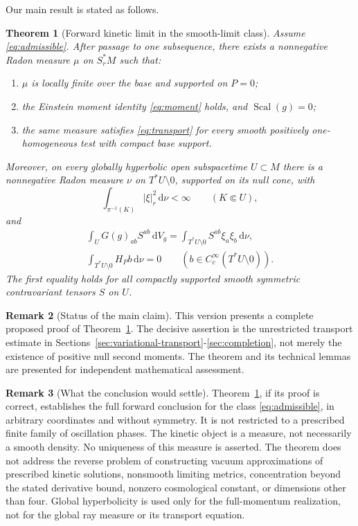 \documentclass[11pt,a4paper]{article}
\numberwithin{equation}{section}
\newcommand{\Scal}{\operatorname{Scal}}
\newcommand{\dd}{\mathrm d}
\newcommand{\dV}{\dd V_g}
\newtheorem{theorem}{Theorem}[section]
\theoremstyle{definition}
\newtheorem{remark}[theorem]{Remark}
\begin{document}
Our main result is stated as follows.

\begin{theorem}[Forward kinetic limit in the smooth-limit class]
\label{thm:main}
Assume \eqref{eq:admissible}. After passage to one subsequence, there exists
a nonnegative Radon measure $\mu$ on $S_r^*M$ such that:
\begin{enumerate}[label=\textup{(\roman*)}]
\item $\mu$ is locally finite over the base and supported on $P=0$;
\item the Einstein moment identity \eqref{eq:moment} holds, and
$\Scal(g)=0$;
\item the same measure satisfies \eqref{eq:transport} for every smooth
positively one-homogeneous test with compact base support.
\end{enumerate}
Moreover, on every globally hyperbolic open subspacetime $U\subset M$
there is a nonnegative Radon measure $\nu$ on $T^*U\setminus0$, supported
on its null cone, with
\begin{equation}\label{eq:full-moment-bound}
\int_{\pi^{-1}(K)}|\xi|_r^2\,\dd\nu<\infty
\qquad(K\Subset U),
\end{equation}
and
\begin{equation}\label{eq:full-equations}
\begin{gathered}
\int_U G(g)_{ab}S^{ab}\,\dV
=\int_{T^*U\setminus0}S^{ab}\xi_a\xi_b\,\dd\nu,\\
\int_{T^*U\setminus0}H_Pb\,\dd\nu=0
\qquad(b\in C_c^\infty(T^*U\setminus0)).
\end{gathered}
\end{equation}
The first equality holds for all compactly supported smooth symmetric
contravariant tensors $S$ on $U$.
\end{theorem}

\begin{remark}[Status of the main claim]\label{rmk:status}
This version presents a complete proposed proof of Theorem~\ref{thm:main}.
The decisive assertion is the unrestricted transport estimate in
Sections~\ref{sec:variational-transport}-\ref{sec:completion}, not merely
the existence of positive null second moments. The theorem and its technical lemmas are presented for independent
mathematical assessment.
\end{remark}

\begin{remark}[What the conclusion would settle]\label{rmk:scope}
Theorem~\ref{thm:main}, if its proof is correct, establishes the full
forward conclusion for the class \eqref{eq:admissible}, in arbitrary
coordinates and without symmetry. It is not restricted to a prescribed
finite family of oscillation phases. The kinetic object is a measure,
not necessarily a smooth density. No uniqueness of this measure is
asserted. The theorem does not address the reverse problem of constructing
vacuum approximations of prescribed kinetic solutions, nonsmooth limiting
metrics, concentration beyond the stated derivative bound, nonzero
cosmological constant, or dimensions other than four. Global hyperbolicity
is used only for the full-momentum realization, not for the global ray
measure or its transport equation.
\end{remark}
\end{document}
